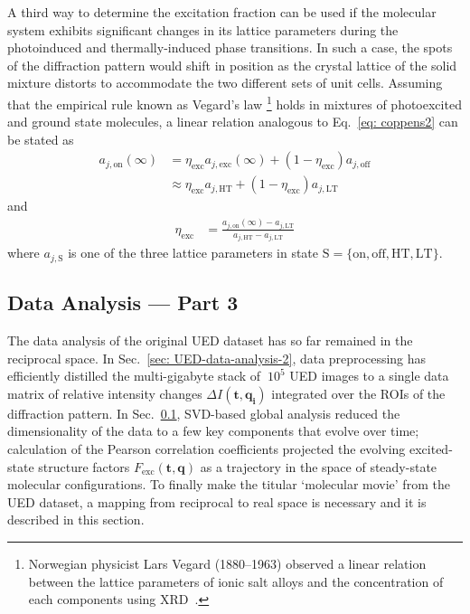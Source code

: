 A third way to determine the excitation fraction can be used
if the molecular system exhibits significant changes in its lattice parameters
during the photoinduced and thermally-induced phase transitions.
In such a case, the spots of the diffraction pattern would shift in position
as the crystal lattice of the solid mixture distorts to accommodate
the two different sets of unit cells.
Assuming that the empirical rule known as Vegard's law%
\footnote{Norwegian physicist Lars Vegard (1880--1963) observed a linear relation between
the lattice parameters of ionic salt alloys and the concentration of each components
using XRD~\cite{Vegard1921, Denton1991}.}
%
holds in mixtures of photoexcited and ground state molecules,
a linear relation analogous to Eq.~\eqref{eq: coppens2}
can be stated as
%
\begin{equation}
  \begin{aligned}
    a_{j, \text{on}}(\infty)
      & = \eta_\text{exc} a_{j, \text{exc}}(\infty)
        + \left( 1 - \eta_\text{exc} \right) a_{j, \text{off}} \\
      & \approx \eta_\text{exc} a_{j, \text{HT}}
        + \left( 1 - \eta_\text{exc} \right) a_{j, \text{LT}}
  \end{aligned}
\end{equation}
%
and
%
\begin{equation}
  \begin{aligned}
    \eta_\text{exc}
      & = \frac{a_{j, \text{on}}(\infty) - a_{j, \text{LT}}}{a_{j, \text{HT}} - a_{j, \text{LT}}}
  \end{aligned}
  \label{eq: vegard}
\end{equation}
%
where $a_{j, \text{S}}$ is one of the three lattice parameters
in state $\text{S} = \{\text{on}, \text{off}, \text{HT}, \text{LT}\}$.


\subsection{Data Analysis --- Part 3}
\label{sec: UED-data-analysis-3}

The data analysis of the original UED dataset has so far remained in the reciprocal space.
%
In Sec.~\ref{sec: UED-data-analysis-2}, data preprocessing has efficiently distilled
the multi-gigabyte stack of $\> 10^5$ UED images to
a single data matrix of relative intensity changes $\Delta I(\boldsymbol{t, q_i})$
integrated over the ROIs of the diffraction pattern.
%
In Sec.~\ref{sec: UED-data-analysis-3}, SVD-based global analysis reduced
the dimensionality of the data to a few key components that evolve over time;
calculation of the Pearson correlation coefficients projected
the evolving excited-state structure factors
$F_\text{exc}(\boldsymbol{t, q})$ as a trajectory
in the space of steady-state molecular configurations.
%
To finally make the titular `molecular movie' from the UED dataset,
a mapping from reciprocal to real space is necessary and
it is described in this section.

